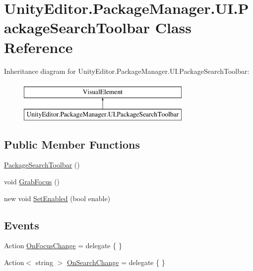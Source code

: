 \hypertarget{class_unity_editor_1_1_package_manager_1_1_u_i_1_1_package_search_toolbar}{}\section{Unity\+Editor.\+Package\+Manager.\+U\+I.\+Package\+Search\+Toolbar Class Reference}
\label{class_unity_editor_1_1_package_manager_1_1_u_i_1_1_package_search_toolbar}
Inheritance diagram for Unity\+Editor.\+Package\+Manager.\+U\+I.\+Package\+Search\+Toolbar\+:\begin{figure}[H]
\begin{center}
\leavevmode
\includegraphics[height=2.000000cm]{class_unity_editor_1_1_package_manager_1_1_u_i_1_1_package_search_toolbar}
\end{center}
\end{figure}
\subsection*{Public Member Functions}
\begin{DoxyCompactItemize}
\item 
\mbox{\hyperlink{class_unity_editor_1_1_package_manager_1_1_u_i_1_1_package_search_toolbar_aaf36e54a512d3fb40286287fe3c8e9e4}{Package\+Search\+Toolbar}} ()
\item 
void \mbox{\hyperlink{class_unity_editor_1_1_package_manager_1_1_u_i_1_1_package_search_toolbar_a8e371da59ad1514781d380ac1fb572cb}{Grab\+Focus}} ()
\item 
new void \mbox{\hyperlink{class_unity_editor_1_1_package_manager_1_1_u_i_1_1_package_search_toolbar_a9ac2bf0eb1fbbb1a00bf9cef1df29d53}{Set\+Enabled}} (bool enable)
\end{DoxyCompactItemize}
\subsection*{Events}
\begin{DoxyCompactItemize}
\item 
Action \mbox{\hyperlink{class_unity_editor_1_1_package_manager_1_1_u_i_1_1_package_search_toolbar_a7303cf1acd5714425240631af3978c93}{On\+Focus\+Change}} = delegate \{ \}
\item 
Action$<$ string $>$ \mbox{\hyperlink{class_unity_editor_1_1_package_manager_1_1_u_i_1_1_package_search_toolbar_a9bc4733cb82e81290e98c859483e0974}{On\+Search\+Change}} = delegate \{ \}
\end{DoxyCompactItemize}


